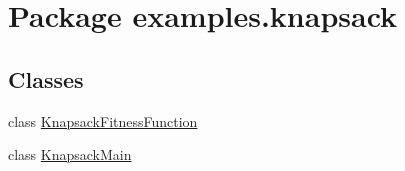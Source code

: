 \hypertarget{namespaceexamples_1_1knapsack}{\section{Package examples.\-knapsack}
\label{namespaceexamples_1_1knapsack}
}
\subsection*{Classes}
\begin{DoxyCompactItemize}
\item 
class \hyperlink{classexamples_1_1knapsack_1_1_knapsack_fitness_function}{Knapsack\-Fitness\-Function}
\item 
class \hyperlink{classexamples_1_1knapsack_1_1_knapsack_main}{Knapsack\-Main}
\end{DoxyCompactItemize}
